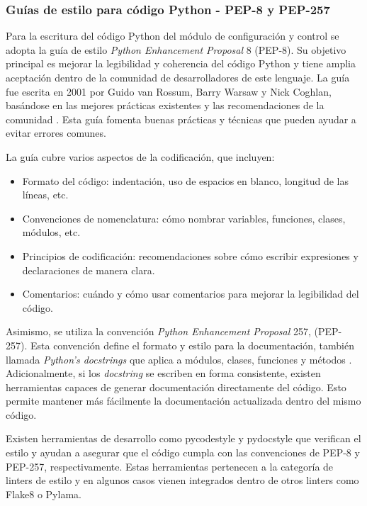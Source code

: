 \subsubsection{Guías de estilo para código Python - PEP-8 y PEP-257}

Para la escritura del código Python del módulo de configuración y control se adopta la guía de estilo \textit{Python Enhancement Proposal} 8 (PEP-8). Su objetivo principal es mejorar la legibilidad y coherencia del código Python y tiene amplia aceptación dentro de la comunidad de desarrolladores de este lenguaje. La guía fue escrita en 2001 por Guido van Rossum, Barry Warsaw y Nick Coghlan, basándose en las mejores prácticas existentes y las recomendaciones de la comunidad \citep{pep8}. Esta guía fomenta buenas prácticas y técnicas que pueden ayudar a evitar errores comunes.

La guía cubre varios aspectos de la codificación, que incluyen:

\begin{itemize}
	\item Formato del código: indentación, uso de espacios en blanco, longitud de las líneas, etc.
	\item Convenciones de nomenclatura: cómo nombrar variables, funciones, clases, módulos, etc.
	\item Principios de codificación: recomendaciones sobre cómo escribir expresiones y declaraciones de manera clara.
	\item Comentarios: cuándo y cómo usar comentarios para mejorar la legibilidad del código.
\end{itemize}

Asimismo, se utiliza la convención \textit{Python Enhancement Proposal} 257, (PEP-257).  Esta convención define el formato y estilo para la documentación, también llamada \textit{Python's docstrings} que aplica a módulos, clases, funciones y métodos \citep{pep257}.  Adicionalmente, si los \textit{docstring} se escriben en forma consistente, existen herramientas capaces de generar documentación directamente del código.  Esto permite mantener más fácilmente la documentación actualizada dentro del mismo código.

Existen herramientas de desarrollo como pycodestyle y pydocstyle que verifican el estilo y ayudan a asegurar que el código cumpla con las convenciones de PEP-8 y PEP-257, respectivamente.  Estas herramientas pertenecen a la categoría de linters de estilo y en algunos casos vienen integrados dentro de otros linters como Flake8 o Pylama.

